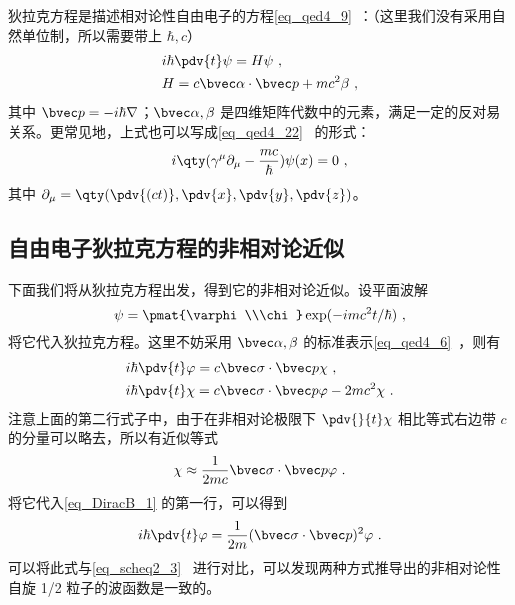 

狄拉克方程是描述相对论性自由电子的方程\autoref{eq_qed4_9}~：（这里我们没有采用自然单位制，所以需要带上 $\hbar,c$）
\begin{equation}
\begin{aligned}
&i\hbar \pdv{t} \psi = H\psi~,\\
&H=c\bvec \alpha\cdot \bvec p+mc^2\beta~,
\end{aligned}
\end{equation}
其中 $\bvec p=-i\hbar\nabla$；$\bvec \alpha,\beta$ 是四维矩阵代数中的元素，满足一定的反对易关系。更常见地，上式也可以写成\autoref{eq_qed4_22}~ 的形式：
\begin{equation}
i\qty(\gamma^\mu \partial_\mu-\frac{mc}{\hbar})\psi(x)=0~,
\end{equation}
其中 $\partial_\mu=\qty(\pdv{(ct)},\pdv{x},\pdv{y},\pdv{z})$。

\subsection{自由电子狄拉克方程的非相对论近似}

下面我们将从狄拉克方程出发，得到它的非相对论近似。设平面波解
\begin{equation}
\psi=\pmat{\varphi\\\chi}\exp(-imc^2t/\hbar)~,
\end{equation}
将它代入狄拉克方程。这里不妨采用 $\bvec \alpha,\beta$ 的标准表示\autoref{eq_qed4_6}~，则有
\begin{equation}\label{eq_DiracB_1}
\begin{aligned}
&i\hbar\pdv{t} \varphi=c\bvec \sigma\cdot \bvec p \chi~,\\
&i\hbar\pdv{t} \chi = c\bvec \sigma\cdot \bvec p \varphi -2mc^2 \chi ~.
\end{aligned}
\end{equation}
注意上面的第二行式子中，由于在非相对论极限下 $\pdv{}{t} \chi$ 相比等式右边带 $c$ 的分量可以略去，所以有近似等式
\begin{equation}\label{eq_DiracB_4}
\chi\approx \frac{1}{2mc} \bvec \sigma\cdot \bvec p \varphi~.
\end{equation}
将它代入\autoref{eq_DiracB_1} 的第一行，可以得到
\begin{equation}\label{eq_DiracB_2}
i\hbar\pdv{t} \varphi=\frac{1}{2m}(\bvec \sigma\cdot \bvec p)^2 \varphi~.
\end{equation}
可以将此式与\autoref{eq_scheq2_3}~ 进行对比，可以发现两种方式推导出的非相对论性自旋 1/2 粒子的波函数是一致的。

